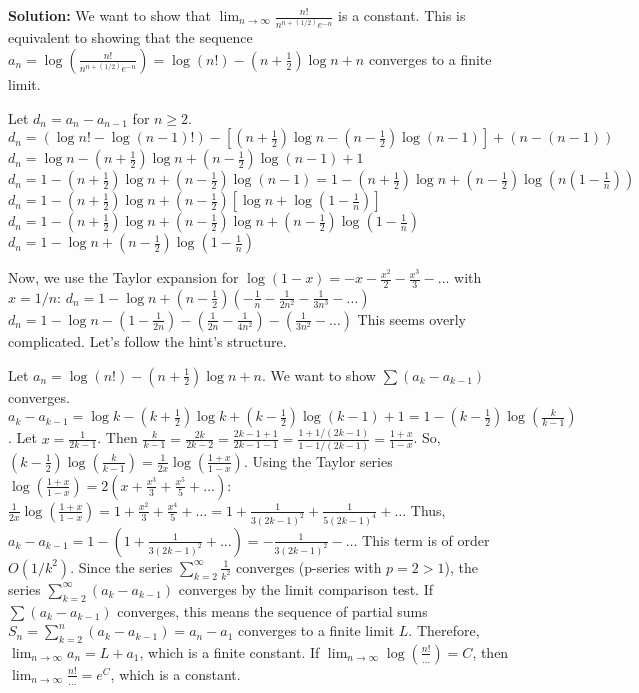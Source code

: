 \noindent\textbf{Solution:}
We want to show that $\lim_{n\to\infty}\frac{n!}{n^{n+(1/2)}e^{-n}}$ is a constant. This is equivalent to showing that the sequence $a_n = \log\left(\frac{n!}{n^{n+(1/2)}e^{-n}}\right) = \log(n!) - (n+\frac{1}{2})\log n + n$ converges to a finite limit.

Let $d_n = a_n - a_{n-1}$ for $n \geq 2$.
$d_n = (\log n! - \log(n-1)!) - [(n+\frac{1}{2})\log n - (n-\frac{1}{2})\log(n-1)] + (n-(n-1))$
$d_n = \log n - (n+\frac{1}{2})\log n + (n-\frac{1}{2})\log(n-1) + 1$
$d_n = 1 - (n+\frac{1}{2})\log n + (n-\frac{1}{2})\log(n-1) = 1 - (n+\frac{1}{2})\log n + (n-\frac{1}{2})\log\left(n(1-\frac{1}{n})\right)$
$d_n = 1 - (n+\frac{1}{2})\log n + (n-\frac{1}{2})\left[\log n + \log(1-\frac{1}{n})\right]$
$d_n = 1 - (n+\frac{1}{2})\log n + (n-\frac{1}{2})\log n + (n-\frac{1}{2})\log(1-\frac{1}{n})$
$d_n = 1 - \log n + (n-\frac{1}{2})\log(1-\frac{1}{n})$

Now, we use the Taylor expansion for $\log(1-x) = -x - \frac{x^2}{2} - \frac{x^3}{3} - \dots$ with $x = 1/n$:
$d_n = 1 - \log n + (n-\frac{1}{2}) \left(-\frac{1}{n} - \frac{1}{2n^2} - \frac{1}{3n^3} - \dots\right)$
$d_n = 1 - \log n - (1 - \frac{1}{2n}) - (\frac{1}{2n} - \frac{1}{4n^2}) - (\frac{1}{3n^2} - \dots)$
This seems overly complicated. Let's follow the hint's structure.

Let $a_n = \log(n!) - (n+\frac{1}{2})\log n + n$. We want to show $\sum (a_{k}-a_{k-1})$ converges.
$a_k-a_{k-1} = \log k - (k+\frac{1}{2})\log k + (k-\frac{1}{2})\log(k-1) + 1 = 1 - (k-\frac{1}{2})\log(\frac{k}{k-1})$.
Let $x = \frac{1}{2k-1}$. Then $\frac{k}{k-1} = \frac{2k}{2k-2} = \frac{2k-1+1}{2k-1-1} = \frac{1+1/(2k-1)}{1-1/(2k-1)} = \frac{1+x}{1-x}$.
So, $(k-\frac{1}{2})\log(\frac{k}{k-1}) = \frac{1}{2x} \log(\frac{1+x}{1-x})$.
Using the Taylor series $\log(\frac{1+x}{1-x}) = 2(x + \frac{x^3}{3} + \frac{x^5}{5} + \dots)$:
$\frac{1}{2x} \log(\frac{1+x}{1-x}) = 1 + \frac{x^2}{3} + \frac{x^4}{5} + \dots = 1 + \frac{1}{3(2k-1)^2} + \frac{1}{5(2k-1)^4} + \dots$
Thus, $a_k - a_{k-1} = 1 - (1 + \frac{1}{3(2k-1)^2} + \dots) = -\frac{1}{3(2k-1)^2} - \dots$
This term is of order $O(1/k^2)$. Since the series $\sum_{k=2}^\infty \frac{1}{k^2}$ converges (p-series with $p=2>1$), the series $\sum_{k=2}^\infty (a_k-a_{k-1})$ converges by the limit comparison test.
If $\sum (a_k-a_{k-1})$ converges, this means the sequence of partial sums $S_n = \sum_{k=2}^n (a_k-a_{k-1}) = a_n - a_1$ converges to a finite limit $L$.
Therefore, $\lim_{n\to\infty} a_n = L+a_1$, which is a finite constant.
If $\lim_{n\to\infty} \log(\frac{n!}{\dots}) = C$, then $\lim_{n\to\infty} \frac{n!}{\dots} = e^C$, which is a constant.


